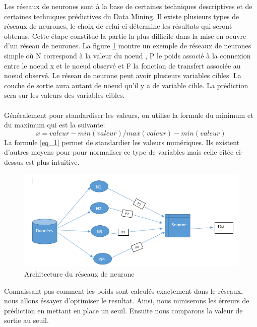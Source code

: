 \documentclass[11pt,a4paper]{report}
\begin{document}
Les réseaux de neurones sont à la base de certaines techniques descriptives et de certaines techniques prédictives du Data Mining. Il existe plusieurs types de réseaux de neurones, le choix de celui-ci détermine les résultats qui seront obtenus. Cette étape constitue la partie la plus difficile dans la mise en oeuvre d'un réseau de neurones. La figure \ref{reseaux} montre un exemple de réseaux de neurones simple où N correspond à la valeur du noeud , P le poids associé à la connexion entre le noeud x et le noeud observé et F la fonction de transfert associée au noeud observé. Le réseau de neurone peut avoir plusieurs variables cibles. La couche de sortie aura autant de noeud qu'il y a de variable cible. La prédiction sera sur les valeurs des variables cibles. \\\\
Généralement pour standardiser les valeurs, on utilise la formule du minimum et du maximum qui est la suivante:
\begin{equation}
  x= valeur - min(valeur)/max(valeur) - min(valeur)
\label{eq_1}
\end{equation}
 La formule \ref{eq_1} permet de standardier les valeurs numériques. Ils existent d'autres moyens pour pour normaliser ce type de variables mais celle citée ci-dessus est plus intuitive. 
    \begin{figure}[h]
   \centering
   \includegraphics[scale=0.80]{structure_reseaux.PNG}
     \caption{Architecture du réseaux de neurone}
     \label{reseaux}
\end{figure}

Connaissant pas comment les poids sont calculés exactement dans le réseaux, nous allons éssayer d'optimiser le resultat. Ainsi,  nous miniserons les érreurs de prédiction en mettant en place un seuil. Ensuite nous comparons la valeur de sortie au seuil.\\\\
\end{document}
